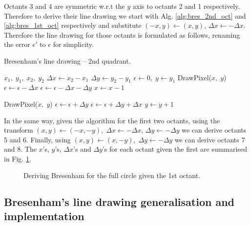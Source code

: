 \documentclass[a4paper]{article}
\begin{document}
Octants 3 and 4 are symmetric w.r.t the $y$ axis to octants 2 and 1 respectively. Therefore to derive their line drawing we start with Alg. \ref{alg:bres_2nd_oct} and \ref{alg:bres_1st_oct} respectively and substitute $(-x,y) \leftarrow (x,y)$, $\Delta x \leftarrow -\Delta x$. Therefore the line drawing for those octants is formulated as follows, renaming the error $\epsilon'$ to $\epsilon$ for simplicity.
\begin{algorithm}[H]
\caption{Bresenham's line drawing -- 2nd quadrant.}
\label{alg:bres_2nd_qd}
\begin{algorithmic}[1]
 {$x_1,\; y_1,\; x_2,\; y_2$} 
	\State $\Delta x \leftarrow x_2 - x_1$
	\State $\Delta y \leftarrow y_2 - y_1$
	\State $\epsilon \leftarrow 0, \; y\leftarrow y_1$ 
	 
			\State DrawPixel($x,\; y$)
				\State $\epsilon \leftarrow \epsilon - \Delta x$ 
			\Else
				\State $\epsilon \leftarrow \epsilon - \Delta x - \Delta y$ 
				\State $x\leftarrow x - 1$
			\EndIf
		\EndFor
	 
			
			\State DrawPixel($x,\; y$)
				\State $\epsilon \leftarrow \epsilon + \Delta y$
			\Else
				\State $\epsilon \leftarrow \epsilon + \Delta y + \Delta x$ 
				\State $y\leftarrow y + 1$
			\EndIf
	    \EndFor	
	\EndIf
\EndProcedure
\end{algorithmic}
\end{algorithm}
In the same way, given the algorithm for the first two octants, using the transform $(x,y) \leftarrow (-x,-y), \; \Delta x \leftarrow -\Delta x$, $\Delta y \leftarrow -\Delta y$ we can derive octants 5 and 6. Finally, using $(x,y) \leftarrow (x,-y), \; \Delta y \leftarrow -\Delta y$ we can derive octants 7 and 8. The $x$'s, $y$'s, $\Delta x$'s and $\Delta y$'s for each octant given the first are summarised in Fig. \ref{fig:all_octants_x_y}.

\begin{figure}[H]
	\centering
	
	\caption{Deriving Bresenham for the full circle given the 1st octant.}
	\label{fig:all_octants_x_y}
\end{figure}


\subsection{Bresenham's line drawing generalisation and implementation}
\end{document}
